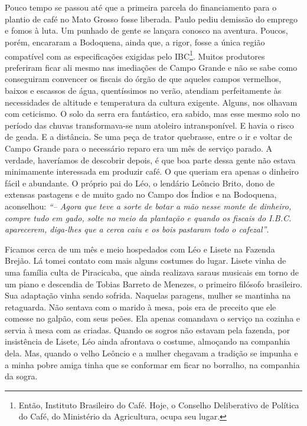 \chapter{}
Pouco tempo se passou até que a primeira parcela do financiamento para o plantio de café no Mato Grosso fosse liberada.
Paulo pediu demissão do emprego e fomos à luta.
Um punhado de gente se lançara conosco na aventura.
Poucos, porém, encararam a Bodoquena, ainda que, a rigor, fosse a única região compatível com as especificações exigidas pelo IBC\footnote{Então, Instituto Brasileiro do Café. Hoje, o Conselho Deliberativo de Política do Café, do Ministério da Agricultura, ocupa seu lugar.}.
Muitos produtores preferiram ficar ali mesmo nas imediações de Campo Grande e não se sabe como conseguiram convencer os fiscais do órgão de que aqueles campos vermelhos, baixos e escassos de água, quentíssimos no verão, atendiam perfeitamente às necessidades de altitude e temperatura da cultura exigente.
Alguns, nos olhavam com ceticismo.
O solo da serra era fantástico, era sabido, mas esse mesmo solo no período das chuvas transformava-se num atoleiro intransponível.
E havia o risco de geada.
E a distância.
Se uma peça de trator quebrasse, entre o ir e voltar de Campo Grande para o necessário reparo era um mês de serviço parado.
A verdade, haveríamos de descobrir depois, é que boa parte dessa gente não estava minimamente interessada em produzir café.
O que queriam era apenas o dinheiro fácil e abundante.
O próprio pai do Léo, o lendário Leôncio Brito, dono de extensas pastagens e de muito gado no Campo dos Índios e na Bodoquena, aconselhou:
\textit{``-- Agora que teve a sorte de botar a mão nesse monte de dinheiro, compre tudo em gado, solte no meio da plantação e quando os fiscais do I.B.C.
aparecerem, diga-lhes que a cerca caiu e os bois pastaram todo o cafezal''}.

Ficamos cerca de um mês e meio hospedados com Léo e Lisete na Fazenda Brejão.
Lá tomei contato com mais alguns costumes do lugar.
Lisete vinha de uma família culta de Piracicaba, que ainda realizava saraus musicais em torno de um piano e descendia de Tobias Barreto de Menezes, o primeiro filósofo brasileiro.
Sua adaptação vinha sendo sofrida.
Naquelas paragens, mulher se mantinha na retaguarda.
Não sentava com o marido à mesa, pois era de preceito que ele comesse no galpão, com seus peões.
Ela apenas comandava o serviço na cozinha e servia à mesa com as criadas.
Quando os sogros não estavam pela fazenda, por insistência de Lisete, Léo ainda afrontava o costume, almoçando na companhia dela.
Mas, quando o velho Leôncio e a mulher chegavam a tradição se impunha e a minha pobre amiga tinha que se conformar em ficar no borralho, na companhia da sogra.


